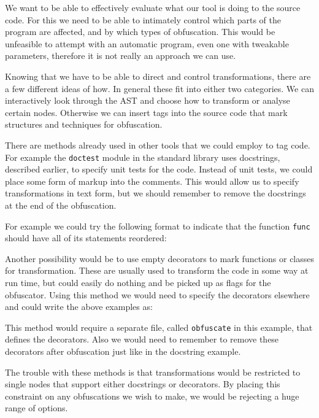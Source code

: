 \documentclass[twoside,a4paper]{report}
\begin{document}
We want to be able to effectively evaluate what our tool is doing to the source code. For this we need to be able to intimately control
which parts of the program are affected, and by which types of obfuscation. This would be unfeasible to attempt with an automatic program,
even one with tweakable parameters, therefore it is not really an approach we can use.

Knowing that we have to be able to direct and control transformations, there are a few different ideas of how. In general these fit into
either two categories. We can interactively look through the AST and choose how to transform or analyse certain nodes. Otherwise we can
insert tags into the source code that mark structures and techniques for obfuscation.

There are methods already used in other tools that we could employ to tag code. For example the \texttt{doctest} module in the standard
library uses docstrings, described earlier, to specify unit tests for the code. Instead of unit tests,
we could place some form of markup into the comments. This would allow us to specify transformations in text form, but we should
remember to remove the docstrings at the end of the obfuscation.

For example we could try the following format to indicate that the function \texttt{func} should have all of its statements reordered:



Another possibility would be to use empty decorators to mark functions or classes for transformation. These are usually used to
transform the code in some way at run time, but could easily do nothing and be picked up as flags for the obfuscator. Using this
method we would need to specify the decorators elsewhere and could write the above examples as:

\newpage



This method would require a separate file, called \texttt{obfuscate} in this example, that defines the decorators. Also we would need to
remember to remove these decorators after obfuscation just like in the docstring example.

The trouble with these methods is that transformations would be restricted to single nodes that support either docstrings or
decorators. By placing this constraint on any obfuscations we wish to make, we would be rejecting a huge range of options.
\end{document}
